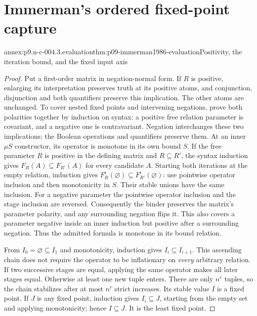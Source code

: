 
\section{Immerman's ordered fixed-point capture}
\label{sec:annex-p09-n-c-004-03}

\begin{annexitem}{annex:p9.n-c-004.3.evaluation}{thm:p09-immerman1986-evaluation}{Positivity, the iteration bound, and the fixed input axis}
\begin{proof}
Put a first-order matrix in negation-normal form.  If \(R\) is positive,
enlarging its interpretation preserves truth at its positive atoms, and
conjunction, disjunction and both quantifiers preserve this implication.
The other atoms are unchanged.  To cover nested fixed points and
intervening negations, prove both polarities together by induction on
syntax: a positive free relation parameter is covariant, and a negative
one is contravariant.  Negation interchanges these two implications;
the Boolean operations and quantifiers preserve them.  At an inner
\(\mu S\) constructor, its operator is monotone in its own bound
\(S\).  If the free parameter \(R\) is positive in the defining
matrix and \(R\subseteq R'\), the syntax induction gives
\(F_R(A)\subseteq F_{R'}(A)\) for every candidate \(A\).
Starting both iterations at the empty relation, induction gives
\(F_R^i(\varnothing)\subseteq F_{R'}^i(\varnothing)\): use
pointwise operator inclusion and then monotonicity in \(S\).
Their stable unions have the same inclusion.  For a negative parameter
the pointwise operator inclusion and the stage inclusion are reversed.
Consequently the binder preserves the matrix's parameter polarity, and
any surrounding negation flips it.  This also covers a parameter
negative inside an inner induction but positive after a surrounding
negation.  Thus the admitted formula is monotone in its bound relation.

From \(I_0=\varnothing\subseteq I_1\) and monotonicity, induction
gives \(I_i\subseteq I_{i+1}\).  This ascending chain does not require
the operator to be inflationary on \emph{every} arbitrary relation.
If two successive stages are equal, applying the same operator makes
all later stages equal.  Otherwise at least one new tuple enters.
There are only \(n^r\) tuples, so the chain stabilizes after at
most \(n^r\) strict increases.  Its stable value \(I\) is a
fixed point.  If \(J\) is any fixed point, induction gives
\(I_i\subseteq J\), starting from the empty set and applying
monotonicity; hence \(I\subseteq J\).  It is the least fixed point.


\end{proof}
\end{annexitem}
